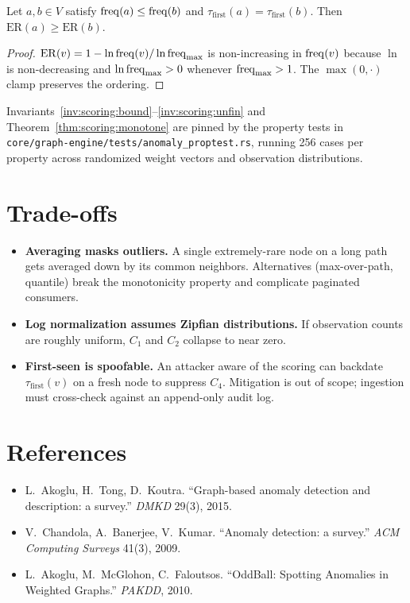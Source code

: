 \documentclass[11pt,openany]{book}
\begin{document}
\begin{theorem}
\label{thm:scoring:monotone}
Let $a, b \in V$ satisfy $\operatorname{freq}(a) \le \operatorname{freq}(b)$ and
$\tau_{\mathrm{first}}(a) = \tau_{\mathrm{first}}(b)$. Then
$\mathrm{ER}(a) \ge \mathrm{ER}(b)$.
\end{theorem}

\begin{proof}
$\mathrm{ER}(v) = 1 - \ln \operatorname{freq}(v) / \ln \operatorname{freq}_{\max}$ is
non-increasing in $\operatorname{freq}(v)$ because $\ln$ is non-decreasing and
$\ln \operatorname{freq}_{\max} > 0$ whenever $\operatorname{freq}_{\max} > 1$. The
$\max(0, \cdot)$ clamp preserves the ordering.
\end{proof}

\begin{implnote}
Invariants~\ref{inv:scoring:bound}--\ref{inv:scoring:unfin} and
Theorem~\ref{thm:scoring:monotone} are pinned by the property tests
in \texttt{core/graph-engine/tests/anomaly\_proptest.rs}, running
256 cases per property across randomized weight vectors and
observation distributions.
\end{implnote}

\section{Trade-offs}
\label{sec:scoring:tradeoffs}

\begin{itemize}
  \item \textbf{Averaging masks outliers.} A single extremely-rare
        node on a long path gets averaged down by its common
        neighbors. Alternatives (max-over-path, quantile) break the
        monotonicity property and complicate paginated consumers.
  \item \textbf{Log normalization assumes Zipfian distributions.}
        If observation counts are roughly uniform, $C_1$ and $C_2$
        collapse to near zero.
  \item \textbf{First-seen is spoofable.} An attacker aware of the
        scoring can backdate $\tau_{\mathrm{first}}(v)$ on a fresh
        node to suppress $C_4$. Mitigation is out of scope; ingestion
        must cross-check against an append-only audit log.
\end{itemize}

\section{References}
\label{sec:scoring:refs}
\begin{itemize}
  \item L.~Akoglu, H.~Tong, D.~Koutra. ``Graph-based anomaly detection
        and description: a survey.'' \emph{DMKD} 29(3), 2015.~\cite{akoglu}
  \item V.~Chandola, A.~Banerjee, V.~Kumar. ``Anomaly detection: a
        survey.'' \emph{ACM Computing Surveys} 41(3), 2009.
  \item L.~Akoglu, M.~McGlohon, C.~Faloutsos. ``OddBall: Spotting
        Anomalies in Weighted Graphs.'' \emph{PAKDD}, 2010.
\end{itemize}
\end{document}
